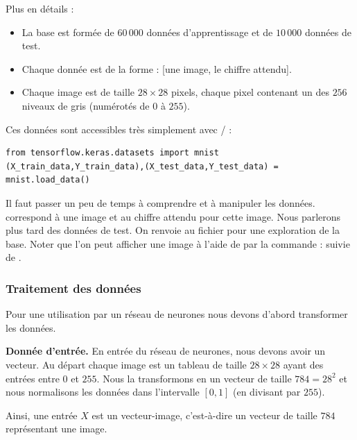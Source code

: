 \documentclass[11pt,class=report,crop=false]{standalone}
\begin{document}
Plus en détails :
\begin{itemize}
  \item La base est formée de $60\,000$ données d'apprentissage et de $10\,000$ données de test.
  \item Chaque donnée est de la forme : [une image, le chiffre attendu].
  \item Chaque image est de taille $28\times28$ pixels, chaque pixel contenant un des $256$ niveaux de gris (numérotés de $0$ à $255$).
\end{itemize}



Ces données sont accessibles très simplement avec \tensorflow/\keras{} :
\begin{lstlisting}
from tensorflow.keras.datasets import mnist
(X_train_data,Y_train_data),(X_test_data,Y_test_data) = mnist.load_data()
\end{lstlisting} 

Il faut passer un peu de temps à comprendre et à manipuler les données.
 correspond à une image et  au chiffre attendu pour cette image. Nous parlerons plus tard des données de test.
On renvoie au fichier  pour une exploration de la base. Noter que l'on peut afficher une image à l'aide de \matplotlib{} par la commande :
suivie de .

\subsubsection*{Traitement des données}

Pour une utilisation par un réseau de neurones nous devons d'abord transformer les données.

\bigskip

\textbf{Donnée d'entrée.} En entrée du réseau de neurones, nous devons avoir un vecteur.
Au départ chaque image est un tableau de taille $28\times 28$ ayant des entrées entre $0$ et $255$. Nous la transformons en un vecteur de taille $784 = 28^2$ et nous normalisons les données dans l'intervalle $[0,1]$ (en divisant par $255$). 


Ainsi, une entrée $X$ est un \og{}vecteur-image\fg{}, c'est-à-dire un vecteur de taille $784$ représentant une image.

\bigskip
\end{document}
